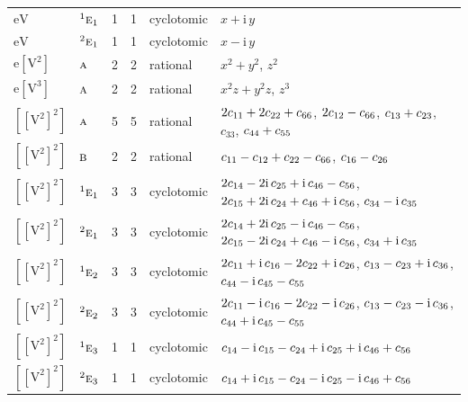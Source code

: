 \documentclass[10pt,a4paper]{article}
\numberwithin{equation}{section}
\newcommand{\irr}[1]{\text{\normalfont\scshape #1}}
\newcommand{\conjpair}[1]{{}^{#1}}
\newcommand{\iunit}{\mathrm{i}}
\newcommand{\jahn}[1]{\mathrm{#1}}
\newlength{\fillwidth}\newlength{\cellwidth}\newlength{\colwidth}
\newcommand{\signbreak}{\penalty100\relax}
\begin{document}
{\begin{longtable}{@{}llrrl>{\RaggedRight\arraybackslash}p{\fillwidth}@{}}
$\jahn{eV}$ & $\conjpair{1}\irr{e}_{1}$ & 1 & 1 & cyclotomic & $x + \iunit{}\,y$\\
$\jahn{eV}$ & $\conjpair{2}\irr{e}_{1}$ & 1 & 1 & cyclotomic & $x - \iunit{}\,y$\\
$\jahn{e[V^{2}]}$ & $\irr{a}$ & 2 & 2 & rational & $x^{2} + y^{2}$, $z^{2}$\\
$\jahn{e[V^{3}]}$ & $\irr{a}$ & 2 & 2 & rational & $x^{2}z + y^{2}z$, $z^{3}$\\
$\jahn{[[V^{2}]^{2}]}$ & $\irr{a}$ & 5 & 5 & rational & $2c_{11} +\signbreak 2c_{22} +\signbreak c_{66}$, $2c_{12} -\signbreak c_{66}$, $c_{13} +\signbreak c_{23}$, $c_{33}$, $c_{44} +\signbreak c_{55}$\\
$\jahn{[[V^{2}]^{2}]}$ & $\irr{b}$ & 2 & 2 & rational & $c_{11} -\signbreak c_{12} +\signbreak c_{22} -\signbreak c_{66}$, $c_{16} -\signbreak c_{26}$\\
$\jahn{[[V^{2}]^{2}]}$ & $\conjpair{1}\irr{e}_{1}$ & 3 & 3 & cyclotomic & $2c_{14} -\signbreak 2\iunit{}\,c_{25} +\signbreak \iunit{}\,c_{46} -\signbreak c_{56}$, $2c_{15} +\signbreak 2\iunit{}\,c_{24} +\signbreak c_{46} +\signbreak \iunit{}\,c_{56}$, $c_{34} -\signbreak \iunit{}\,c_{35}$\\
$\jahn{[[V^{2}]^{2}]}$ & $\conjpair{2}\irr{e}_{1}$ & 3 & 3 & cyclotomic & $2c_{14} +\signbreak 2\iunit{}\,c_{25} -\signbreak \iunit{}\,c_{46} -\signbreak c_{56}$, $2c_{15} -\signbreak 2\iunit{}\,c_{24} +\signbreak c_{46} -\signbreak \iunit{}\,c_{56}$, $c_{34} +\signbreak \iunit{}\,c_{35}$\\
$\jahn{[[V^{2}]^{2}]}$ & $\conjpair{1}\irr{e}_{2}$ & 3 & 3 & cyclotomic & $2c_{11} +\signbreak \iunit{}\,c_{16} -\signbreak 2c_{22} +\signbreak \iunit{}\,c_{26}$, $c_{13} -\signbreak c_{23} +\signbreak \iunit{}\,c_{36}$, $c_{44} -\signbreak \iunit{}\,c_{45} -\signbreak c_{55}$\\
$\jahn{[[V^{2}]^{2}]}$ & $\conjpair{2}\irr{e}_{2}$ & 3 & 3 & cyclotomic & $2c_{11} -\signbreak \iunit{}\,c_{16} -\signbreak 2c_{22} -\signbreak \iunit{}\,c_{26}$, $c_{13} -\signbreak c_{23} -\signbreak \iunit{}\,c_{36}$, $c_{44} +\signbreak \iunit{}\,c_{45} -\signbreak c_{55}$\\
$\jahn{[[V^{2}]^{2}]}$ & $\conjpair{1}\irr{e}_{3}$ & 1 & 1 & cyclotomic & $c_{14} -\signbreak \iunit{}\,c_{15} -\signbreak c_{24} +\signbreak \iunit{}\,c_{25} +\signbreak \iunit{}\,c_{46} +\signbreak c_{56}$\\
$\jahn{[[V^{2}]^{2}]}$ & $\conjpair{2}\irr{e}_{3}$ & 1 & 1 & cyclotomic & $c_{14} +\signbreak \iunit{}\,c_{15} -\signbreak c_{24} -\signbreak \iunit{}\,c_{25} -\signbreak \iunit{}\,c_{46} +\signbreak c_{56}$\\

\end{longtable}}
\end{document}
